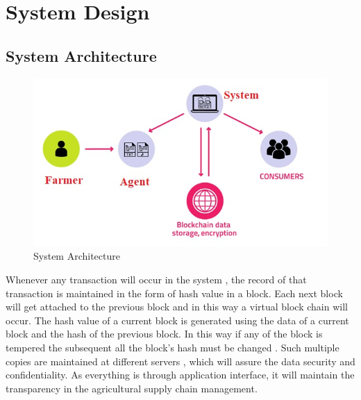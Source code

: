 \documentclass[oneside,a4paper,12pt]{report}
\begin{document}

\chapter{System Design}


\section{System Architecture}

\begin{center}
	\begin{figure}[!htbp]
		\centering
		\includegraphics[scale=1.1]{architecture}
        \caption{System Architecture}
	    \label{fig:System Architecture}
	\end{figure}
\end{center}
Whenever any transaction will occur in the system , the record of that transaction is maintained in the form of hash value in a block. Each next block will get attached to the previous block and in this way a virtual block chain will occur. The hash value of a current block is generated using the data of a current block and the hash of the previous block. In this way if any of the block is tempered the subsequent all the block’s hash must be changed . Such multiple copies are maintained at different servers , which will assure the data security and confidentiality.  As everything is through application interface, it will maintain the transparency in the agricultural supply chain management.
\end{document}
